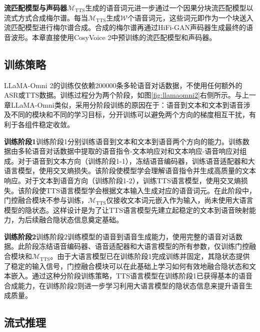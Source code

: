 \textbf{流匹配模型与声码器}\quad $\mathcal{M}_\text{TTS}$生成的语音词元进一步通过一个因果分块流匹配模型\citep{lipman2023flow}以流式方式合成梅尔谱。每当$\mathcal{M}_\text{TTS}$生成$\mathcal{W}$个语音词元，这些词元即作为一个块送入流匹配模型进行梅尔谱合成。合成的梅尔谱再通过HiFi-GAN\citep{hifigan}声码器生成最终的语音波形。本章直接使用CosyVoice 2中预训练的流匹配模型和声码器。

\subsection{训练策略}

LLaMA-Omni 2的训练仅依赖200000条多轮语音对话数据，不使用任何额外的ASR或TTS数据。训练过程分为两个阶段，如图\ref{fig:llamaomni2}右侧所示。与上一章LLaMA-Omni类似，采用分阶段训练的原因在于：语音到文本和文本到语音涉及不同的模块和不同的学习目标，分开训练可以避免两个方向的梯度相互干扰，有利于各组件稳定收敛。

\textbf{训练阶段1}\quad 训练阶段1分别训练语音到文本和文本到语音两个方向的能力。训练数据由多轮语音对话数据中提取的语音指令-文本响应对和文本响应-语音响应对组成。对于语音到文本方向（训练阶段1-1），冻结语音编码器，训练语音适配器和大语言模型，使用交叉熵损失。该阶段使模型学会理解语音指令并生成高质量的文本响应。对于文本到语音方向（训练阶段1-2），训练TTS语言模型，使用交叉熵损失。该阶段使TTS语言模型学会根据文本输入生成对应的语音词元。在此阶段中，门控融合模块不参与训练，$\mathcal{M}_\text{TTS}$仅接收文本词元嵌入作为输入，尚未使用大语言模型的隐状态。这样设计是为了让TTS语言模型先建立起稳定的文本到语音映射能力，为后续融合隐状态信息奠定基础。

\textbf{训练阶段2}\quad 训练阶段2训练模型的语音到语音生成能力，使用完整的语音对话数据。此阶段冻结语音编码器、语音适配器和大语言模型的所有参数，仅训练门控融合模块和$\mathcal{M}_\text{TTS}$。由于大语言模型已在训练阶段1完成训练并固定，其隐状态提供了稳定的输入信号，门控融合模块可以在此基础上学习如何有效地融合隐状态和文本嵌入。通过这种分阶段训练策略，TTS语言模型在训练阶段1已获得基本的语音合成能力，在训练阶段2则进一步学习利用大语言模型的隐状态信息来提升语音生成质量。

\subsection{流式推理}

